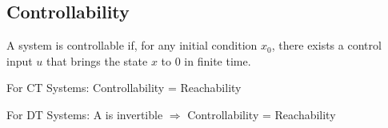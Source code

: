 \subsection{Controllability}
    A system is controllable if, for any initial condition $x_0$, there exists a control input $u$ that brings the state $x$ to $0$ in finite time.

    For CT Systems: Controllability = Reachability

    For DT Systems: A is invertible $\Rightarrow$ Controllability = Reachability
